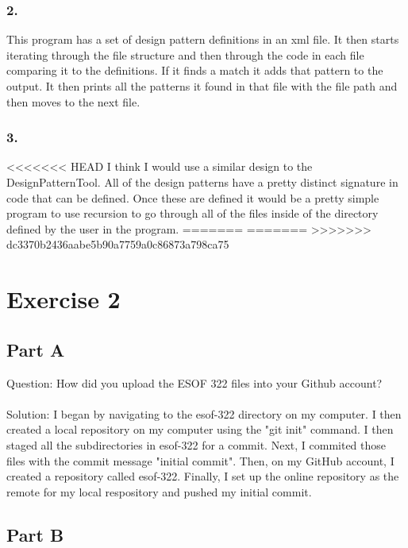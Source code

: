 \documentclass{article}
\begin{document}
\subsubsection*{2.}
This program has a set of design pattern definitions in an xml file. It then starts iterating through the file structure and then through the code in each file comparing it to the definitions. If it finds a match it adds that pattern to the output. It then prints all the patterns it found in that file with the file path and then moves to the next file. 
\subsubsection*{3.}
<<<<<<< HEAD
I think I would use a similar design to the DesignPatternTool. All of the design patterns have a pretty distinct signature in code that can be defined. Once these are defined it would be a pretty simple program to use recursion to go through all of the files inside of the directory defined by the user in the program.   
=======
=======
>>>>>>> dc3370b2436aabe5b90a7759a0c86873a798ca75

\newpage

\section*{Exercise 2}

\subsection*{Part A}

Question: How did you upload the ESOF 322 files into your Github account? \\\\
Solution: I began by navigating to the esof-322 directory on my computer. I then created a local repository on my computer using the "git init" command. 
I then staged all the subdirectories in esof-322 for a commit. Next, I commited those files with the commit message "initial commit".
Then, on my GitHub account, I created a repository called esof-322.
Finally, I set up the online repository as the remote for my local respository and pushed my initial commit.

\subsection*{Part B}
\end{document}
